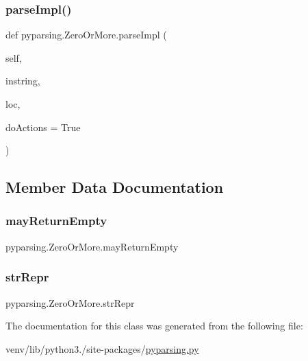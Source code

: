 \subsubsection{\texorpdfstring{parse\+Impl()}{parseImpl()}}
{\footnotesize\ttfamily def pyparsing.\+Zero\+Or\+More.\+parse\+Impl (\begin{DoxyParamCaption}\item[{}]{self,  }\item[{}]{instring,  }\item[{}]{loc,  }\item[{}]{do\+Actions = {\ttfamily True} }\end{DoxyParamCaption})}



\subsection{Member Data Documentation}
\mbox{\label{classpyparsing_1_1ZeroOrMore_ab713347f237f2ce4e43417f2494d5a0a}} 
\subsubsection{\texorpdfstring{may\+Return\+Empty}{mayReturnEmpty}}
{\footnotesize\ttfamily pyparsing.\+Zero\+Or\+More.\+may\+Return\+Empty}

\mbox{\label{classpyparsing_1_1ZeroOrMore_af3e8cdb86761828dbf2e55d1e27ea150}} 
\subsubsection{\texorpdfstring{str\+Repr}{strRepr}}
{\footnotesize\ttfamily pyparsing.\+Zero\+Or\+More.\+str\+Repr}



The documentation for this class was generated from the following file\+:\begin{DoxyCompactItemize}
\item 
venv/lib/python3./site-\/packages/\hyperlink{pyparsing_8py}{pyparsing.\+py}\end{DoxyCompactItemize}
